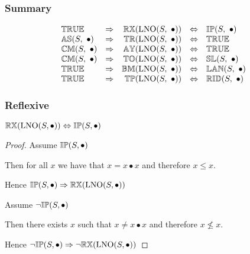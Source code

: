 \documentclass[../Summary.tex]{subfiles}
\begin{document}
\subsubsection{Summary}

\[
\begin{array}{lcrcl} 
{\mathbb{TRUE}}
	& \Rightarrow
	& {\mathbb{RX}}(\mathrm{LNO}(S,\ \bullet)) 
    & \Leftrightarrow
    & {\mathbb{IP}}(S,\ \bullet)  \\
{\mathbb{AS}}(S,\ \bullet)
	& \Rightarrow
	& {\mathbb{TR}}(\mathrm{LNO}(S,\ \bullet))
    & \Leftrightarrow
    & {\mathbb{TRUE}} \\
{\mathbb{CM}}(S,\ \bullet)
	& \Rightarrow
	& {\mathbb{AY}}(\mathrm{LNO}(S,\ \bullet))
    & \Leftrightarrow
    & {\mathbb{TRUE}} \\ 
{\mathbb{CM}}(S,\ \bullet)
	& \Rightarrow
	& {\mathbb{TO}}(\mathrm{LNO}(S,\ \bullet))
    & \Leftrightarrow
    & {\mathbb{SL}}(S,\ \bullet) \\
{\mathbb{TRUE}}
	& \Rightarrow
	& {\mathbb{BM}}(\mathrm{LNO}(S,\ \bullet))
    & \Leftrightarrow
    & {\mathbb{LAN}}(S,\ \bullet) \\ 
{\mathbb{TRUE}}
	& \Rightarrow
	& {\mathbb{TP}}(\mathrm{LNO}(S,\ \bullet))
    & \Leftrightarrow
    & {\mathbb{RID}}(S,\ \bullet) \\ 
\end{array} 
\] 





\subsubsection{Reflexive}

\begin{theorem} \label{thm:lno_reflexive}
${\mathbb{RX}}(\mathrm{LNO}(S,\bullet)) \Leftrightarrow {\mathbb{IP}}(S, \bullet)$
\end{theorem}

\begin{proof}

\vspace{0.5em}

Assume ${\mathbb{IP}}(S,\bullet)$
\begin{ind}
Then for all $x$ we have that $x = x \bullet x$ and therefore $x \leq x$.
\end{ind}
Hence ${\mathbb{IP}}(S,\bullet) \Rightarrow {\mathbb{RX}}(\mathrm{LNO}(S,\bullet))$

\vspace{2em}

Assume $\neg {\mathbb{IP}}(S,\bullet)$
\begin{ind}
Then there exists $x$ such that $x \neq x \bullet x$ and therefore $x \nleq x$.
\end{ind}
Hence $\neg {\mathbb{IP}}(S,\bullet) \Rightarrow \neg {\mathbb{RX}}(\mathrm{LNO}(S,\bullet))$

\end{proof}
\end{document}
